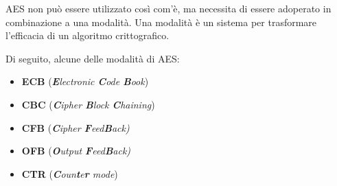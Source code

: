  

\textsf{\small AES non può essere utilizzato così com'è, ma necessita di essere adoperato in combinazione a una modalità. } %
\textsf{\small Una modalità è un sistema per trasformare l'efficacia di un algoritmo crittografico.} %

     

\textsf{\small Di seguito, alcune delle modalità di AES: }

\begin{itemize} %
	\item \textsf{\small \textbf{ECB} (\emph{\textbf{E}lectronic \textbf{C}ode \textbf{B}ook})}
	\item \textsf{\small \textbf{CBC} (\emph{\textbf{C}ipher \textbf{B}lock \textbf{C}haining})}
	\item \textsf{\small \textbf{CFB} (\emph{\textbf{C}ipher \textbf{F}eed\textbf{B}ack)}}
	\item \textsf{\small \textbf{OFB} (\emph{\textbf{O}utput \textbf{F}eed\textbf{B}ack)}}
	\item \textsf{\small \textbf{CTR} (\emph{\textbf{C}oun\textbf{t}e\textbf{r} mode})}
\end{itemize} 


\newpage

